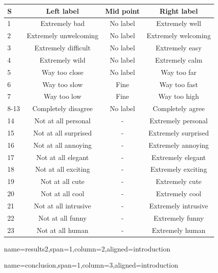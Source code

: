 \documentclass[paperwidth=160cm,paperheight=100cm,landscape,fontscale=0.3010]{baposter}
\begin{document}
\begin{poster}
{%
\begin{center}
		\begin{tabular}{l|c|c|c}
		S     & Left label & Mid point & Right label \\\hline
		1   & Extremely bad  & No label & Extremely well        \\\hline
		2   & Extremely unwelcoming & No label & Extremely welcoming          \\\hline
		3   & Extremely difficult & No label & Extremely easy         \\\hline
		4   & Extremely wild & No label & Extremely calm \\\hline
		5   & Way too close  & No label & Way too far        \\\hline
		6   & Way too slow & Fine & Way too fast         \\\hline
		7   & Way too low & Fine & Way too high \\\hline
		8-13   & Completely disagree  & No label & Completely agree   \\\hline
		14   & Not at all personal & - & Extremely personal        \\\hline
		15   & Not at all surprised & - & Extremely surprised      \\\hline
		16   & Not at all annoying  & - & Extremely annoying        \\\hline
		17   & Not at all elegant  & - & Extremely elegant         \\\hline
		18   & Not at all exciting & - & Extremely exciting          \\\hline
		19   & Not at all cute & - & Extremely cute          \\\hline                        
		20   & Not at all cool  & - & Extremely cool         \\\hline
		21   & Not at all intrusive & - & Extremely intrusive         \\\hline
		22   & Not at all funny & - & Extremely funny          \\\hline
		23   & Not at all human & - & Extremely human
	\end{tabular}        
\end{center}
}



{name=results2,span=1,column=2,aligned=introduction}
{\parskip 5pt


}


{name=conclusion,span=1,column=3,aligned=introduction}
{\parskip 5pt

}
\end{poster}
\end{document}
